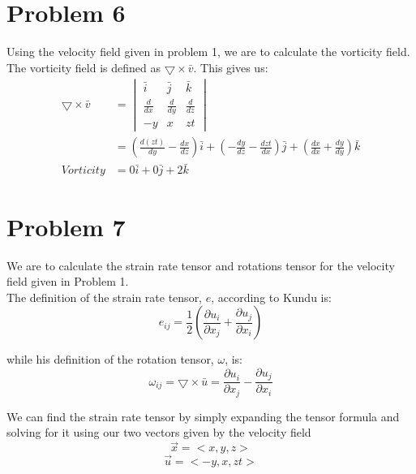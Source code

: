 \documentclass[11pt,a4paper,english]{article}
\numberwithin{equation}{section}
\begin{document}
\section{Problem 6}
Using the velocity field given in problem 1, we are to calculate the vorticity field.
The vorticity field is defined as $\bigtriangledown \times \bar{v}$.
This gives us:
\begin{align*}
	\bigtriangledown \times \bar{v} &= 		
		\begin{vmatrix}
			\bar{i} 	 & \bar{j} 		& \bar{k}			 		\\
  			\frac{d}{dx} & \frac{d}{dy}	& \frac{d}{dz}				\\
  			-y 			 & x 			& zt			 		
		\end{vmatrix}
		\\
		&=  (\frac{d(zt)}{dy}-\frac{dx}{dz})\bar{i} + 
			(-\frac{dy}{dz}-\frac{dzt}{dx})\bar{j} + 
			(\frac{dx}{dx}+\frac{dy}{dy})\bar{k}
		\\
		Vorticity &= 0\bar{i} + 0\bar{j} + 2\bar{k}
\end{align*}

\section{Problem 7}
We are to calculate the strain rate tensor and rotations tensor for the velocity field given in Problem 1. \\
The definition of the strain rate tensor, $e$, according to Kundu is:
\[ 
	e_{ij}
   		= \frac{1}{2} \left( \frac{\partial u_i}{\partial x_j}
      + \frac{\partial u_j}{\partial x_i}
       \right)
\]

while his definition of the rotation tensor, $\omega$, is:
\[
	\omega_{ij} = \bigtriangledown \times \bar{u}=
		\frac{\partial u_i}{\partial x_j} -
		\frac{\partial u_j}{\partial x_i}
\]
     
We can find the strain rate tensor by simply expanding the tensor formula and solving for it using our two vectors given by the velocity field
\[\vec{x}= <x, y, z>\] \[\vec{u}=<-y, x, zt>\]
\end{document}
